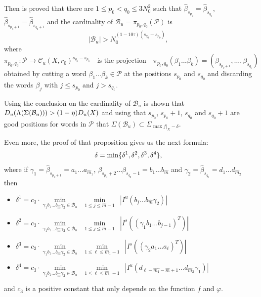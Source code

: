 \documentclass[12pt]{amsart}
\providecommand{\abs}[1]{\lvert#1\rvert}
\theoremstyle{plain} %
\theoremstyle{definition} %
\numberwithin{equation}{section}
\begin{document}
Then is proved that there are $1\leq p_0<q_0\leq 3N_0^2$ such that $\widehat{\beta}_{s_{p_0}}=\widehat{\beta}_{s_{q_0}}$, $\widehat{\beta}_{s_{p_0+1}}=\widehat{\beta}_{s_{q_0+1}}$ and the cardinality of $\mathcal{B}_u=\pi_{p_0,q_0}(\mathcal{P})$ is
$$\abs{\mathcal{B}_u} > N_0^{(1-10\tau)(s_{q_0}-s_{p_0})},$$
where
$$\pi_{p_0,q_0}: \mathcal{P}\to \mathcal{C}_u(X,r_0)^{s_{q_0}- s_{p_0}} \quad \textrm{is the projection} \quad 
\pi_{p_0,q_0}(\beta_1\dots\beta_k)=(\beta_{s_{p_0+1}},\dots,\beta_{s_{q_0}})$$
obtained by cutting a word $\beta_1\dots\beta_k\in \mathcal{P}$ at the positions $s_{p_0}$ and $s_{q_0}$ and discarding the words $\beta_j$ with $j\leq s_{p_0}$ and $j>s_{q_0}$.

Using the conclusion on the cardinality of $\mathcal{B}_u$ is shown that $D_u(\Lambda(\Sigma(\mathcal{B}_u)))>\\(1-\eta)D_u(X)$ and using that $s_{p_0}$, $s_{p_0}+1$, $s_{q_0}$ and $s_{q_0}+1$ are good positions for words in $\mathcal{P}$ that $\Sigma(\mathcal{B}_u)\subset\Sigma_{\max f|_X-\delta}$.

Even more, the proof of that proposition gives us the next formula:
\begin{equation}\label{delta}
\delta=\min\{\delta^1, \delta^2, \\ \delta^3, \delta^4\},
\end{equation}
where if $\gamma_1= \widehat{\beta}_{s_{p_0+1}}= a_1\dots a_{\widehat{m}_1}$, $\beta_{s_{p_0}+2}\dots\beta_{s_{q_0}-1}=b_{1}\dots b_{\widehat{m}}$ and $\gamma_2=\widehat{\beta}_{s_{q_0}}=d_{1}\dots d_{\widehat{m}_2}$ then
\begin{itemize}
\item $\delta^1=c_3\cdot\min\limits_{\gamma_1 b_1\dots b_{\widehat{m}}\gamma_2\in\mathcal{B}_u}\,\,\, \min\limits_{1\leq j\leq \widehat{m}-1}\,\,\, |I^u(b_j\dots b_{\widehat{m}}\gamma_2)| $ 
\item $ \delta^2=c_3\cdot\min\limits_{\gamma_1 b_1\dots b_{\widehat{m}}\gamma_2\in\mathcal{B}_u}\,\,\, \min\limits_{1\leq j\leq \widehat{m}-1}\,\,\, |I^s((\gamma_1b_1\dots b_{j-1})^T)|$ 
\item $\delta^3=c_3\cdot\min\limits_{\gamma_1 b_1\dots b_{\widehat{m}}\gamma_2\in\mathcal{B}_u}\,\,\, \min\limits_{1\leq \ell\leq \widehat{m}_1-1}\,\,\, |I^s((\gamma_2 a_1\dots a_{\ell})^T)|$
\item $\delta^4=c_3\cdot\min\limits_{\gamma_1 b_1\dots b_{\widehat{m}}\gamma_2\in\mathcal{B}_u}\,\,\, \min\limits_{1\leq \ell\leq \widehat{m}_1-1}\,\,\, |I^u(d_{\ell-\widehat{m_1}-\widehat{m}+1}\dots d_{\widehat{m}_2}\gamma_1)|
$\end{itemize}
and $c_3$ is a positive constant that only depends on the function $f$ and $\varphi$. 
\end{document}
